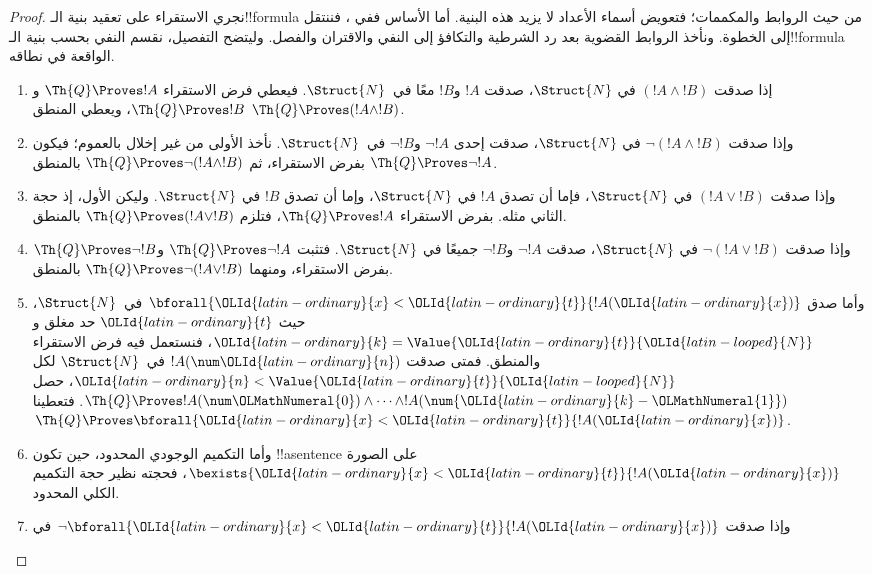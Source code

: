 \documentclass[../../../include/open-logic-section]{subfiles}
\begin{document}
\begin{proof}
نجري الاستقراء على تعقيد بنية الـ!!{formula} من حيث الروابط والمكممات؛
فتعويض أسماء الأعداد لا يزيد هذه البنية.
%
أما الأساس ففي ، فننتقل إلى الخطوة.
ونأخذ الروابط القضوية بعد رد الشرطية والتكافؤ إلى النفي والاقتران والفصل.
وليتضح التفصيل، نقسم النفي بحسب بنية الـ!!{formula} الواقعة في نطاقه.

\begin{enumerate}
\item إذا صدقت $(!A\land !B)$ في $\Struct{N}$، صدقت
$!A$ و$!B$ معًا في~$\Struct{N}$.
فيعطي فرض الاستقراء $\Th{Q}\Proves !A$
و$\Th{Q}\Proves !B$، ويعطي المنطق $\Th{Q}\Proves(!A\land !B)$.
%
\item وإذا صدقت $\lnot(!A\land !B)$ في $\Struct{N}$،
صدقت إحدى $\lnot !A$ و$\lnot !B$ في~$\Struct{N}$.
نأخذ الأولى من غير إخلال بالعموم؛
فيكون $\Th{Q}\Proves\lnot !A$ بفرض الاستقراء،
ثم $\Th{Q}\Proves\lnot(!A\land !B)$ بالمنطق.
%
\item وإذا صدقت $(!A\lor !B)$ في $\Struct{N}$،
فإما أن تصدق $!A$ في $\Struct{N}$، وإما أن تصدق $!B$ في $\Struct{N}$.
وليكن الأول، إذ حجة الثاني مثله.
بفرض الاستقراء $\Th{Q}\Proves !A$،
فتلزم $\Th{Q}\Proves(!A\lor !B)$ بالمنطق.
%
\item وإذا صدقت $\lnot(!A\lor !B)$ في $\Struct{N}$،
صدقت $\lnot !A$ و$\lnot !B$ جميعًا في $\Struct{N}$.
فتثبت $\Th{Q}\Proves\lnot !A$
و$\Th{Q}\Proves\lnot !B$ بفرض الاستقراء،
ومنهما $\Th{Q}\Proves\lnot(!A\lor !B)$ بالمنطق.
%
\item وأما صدق $\bforall{\OLId{latin-ordinary}{x}<\OLId{latin-ordinary}{t}}{!A(\OLId{latin-ordinary}{x})}$ في~$\Struct{N}$،
حيث $\OLId{latin-ordinary}{t}$ حد مغلق و$\OLId{latin-ordinary}{k}=\Value{\OLId{latin-ordinary}{t}}{\OLId{latin-looped}{N}}$، فنستعمل فيه فرض الاستقراء والمنطق.
فمتى صدقت $!A(\num \OLId{latin-ordinary}{n})$ في~$\Struct{N}$ لكل
$\OLId{latin-ordinary}{n}<\Value{\OLId{latin-ordinary}{t}}{\OLId{latin-looped}{N}}$، حصل
$\Th{Q}\Proves !A(\num \OLMathNumeral{0})\land\dots\land !A(\num{\OLId{latin-ordinary}{k}-\OLMathNumeral{1}})$.
فتعطينا 
$\Th{Q}\Proves\bforall{\OLId{latin-ordinary}{x}<\OLId{latin-ordinary}{t}}{!A(\OLId{latin-ordinary}{x})}$.
%
\item وأما التكميم الوجودي المحدود، حين تكون !!a{sentence} على الصورة
$\bexists{\OLId{latin-ordinary}{x}<\OLId{latin-ordinary}{t}}{!A(\OLId{latin-ordinary}{x})}$، فحجته نظير حجة التكميم الكلي المحدود.
%
\item وإذا صدقت $\lnot\bforall{\OLId{latin-ordinary}{x}<\OLId{latin-ordinary}{t}}{!A(\OLId{latin-ordinary}{x})}$ في

\end{enumerate}
\end{proof}
\end{document}
